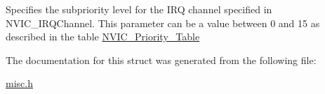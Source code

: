 \label{structNVIC__InitTypeDef_aecc22a002244e3f1f9448dbe46c1db4b}
Specifies the subpriority level for the IRQ channel specified in NVIC\_\-IRQChannel. This parameter can be a value between 0 and 15 as described in the table \hyperlink{group__NVIC__Priority__Table}{NVIC\_\-Priority\_\-Table} 

The documentation for this struct was generated from the following file:\begin{DoxyCompactItemize}
\item 
\hyperlink{misc_8h}{misc.h}\end{DoxyCompactItemize}
